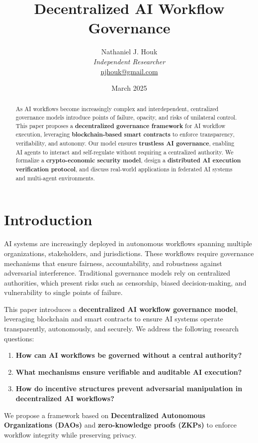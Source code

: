 \documentclass{article}
\title{Decentralized AI Workflow Governance}
\author{Nathaniel J. Houk\\
\textit{Independent Researcher}\\
\href{mailto:njhouk@gmail.com}{njhouk@gmail.com}}
\date{March 2025}
\begin{document}
\maketitle

\begin{abstract}
As AI workflows become increasingly complex and interdependent, centralized governance models introduce points of failure, opacity, and risks of unilateral control. This paper proposes a \textbf{decentralized governance framework} for AI workflow execution, leveraging \textbf{blockchain-based smart contracts} to enforce transparency, verifiability, and autonomy. Our model ensures \textbf{trustless AI governance}, enabling AI agents to interact and self-regulate without requiring a centralized authority. We formalize a \textbf{crypto-economic security model}, design a \textbf{distributed AI execution verification protocol}, and discuss real-world applications in federated AI systems and multi-agent environments.
\end{abstract}

\section{Introduction}
AI systems are increasingly deployed in autonomous workflows spanning multiple organizations, stakeholders, and jurisdictions. These workflows require governance mechanisms that ensure fairness, accountability, and robustness against adversarial interference. Traditional governance models rely on centralized authorities, which present risks such as censorship, biased decision-making, and vulnerability to single points of failure.

This paper introduces a \textbf{decentralized AI workflow governance model}, leveraging blockchain and smart contracts to ensure AI systems operate transparently, autonomously, and securely. We address the following research questions:
\begin{enumerate}
    \item \textbf{How can AI workflows be governed without a central authority?}
    \item \textbf{What mechanisms ensure verifiable and auditable AI execution?}
    \item \textbf{How do incentive structures prevent adversarial manipulation in decentralized AI workflows?}
\end{enumerate}

We propose a framework based on \textbf{Decentralized Autonomous Organizations (DAOs)} and \textbf{zero-knowledge proofs (ZKPs)} to enforce workflow integrity while preserving privacy.
\end{document}
